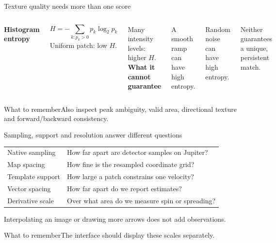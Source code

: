\documentclass[aspectratio=169,11pt]{beamer}
\newcommand{\prov}{}
\newcommand{\evidence}[1]{\gdef\prov{#1}}
\newcommand{\takeaway}[1]{\vspace{0.3em}\begin{block}{What to remember}#1\end{block}}
\begin{document}
\evidence{Entropy is a reported quality measure; limitations and extra checks are original analysis/proposals.}
\begin{frame}{Texture quality needs more than one score}
 \begin{columns}[T]
 \textbf{Histogram entropy}\par
 \[H=-\sum_{k:p_k>0}p_k\log_2p_k\]
 Uniform patch: low $H$.\par
 Many intensity levels: higher $H$.
 \textbf{What it cannot guarantee}\par
 A smooth ramp can have high entropy.\par
 Random noise can have high entropy.\par
 Neither guarantees a unique, persistent match.
 \end{columns}
 \takeaway{Also inspect peak ambiguity, valid area, directional texture and forward/backward consistency.}
\end{frame}

\evidence{Original scale explanation, motivated by the experiment's published sampling and template sizes.}
\begin{frame}{Sampling, support and resolution answer different questions}
 \small
 \begin{tabularx}{\linewidth}{@{}p{3.7cm}X@{}}
 \toprule
 Native sampling & How far apart are detector samples on Jupiter?\\
 Map spacing & How fine is the resampled coordinate grid?\\
 Template support & How large a patch constrains one velocity?\\
 Vector spacing & How far apart do we report estimates?\\
 Derivative scale & Over what area do we measure spin or spreading?\\
 \bottomrule
 \end{tabularx}
 \vspace{0.4cm}
 Interpolating an image or drawing more arrows does not add observations.
 \takeaway{The interface should display these scales separately.}
\end{frame}
\end{document}
